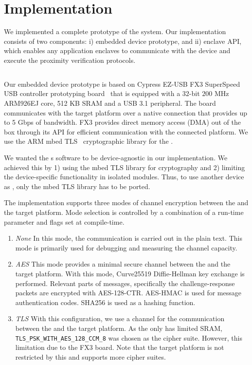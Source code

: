 \section{Implementation}
\label{sec:implementation}

We implemented a complete prototype of the \name system. Our implementation consists of two components: i) \device embedded device prototype, and ii) \name enclave API, which enables any application enclaves to communicate with the \device device and execute the proximity verification protocols.

\subsection{\device} 

Our embedded device prototype is based on Cypress EZ-USB FX3 SuperSpeed USB controller prototyping board~\cite{fx3} that is equipped with a $32$-bit $200$ MHz ARM926EJ core, 512 KB SRAM and a USB 3.1 peripheral. The board communicates with the target platform over a native  connection that provides up to 5 Gbps of bandwidth. FX3 provides direct memory access (DMA) out of the box through its API for efficient communication with the connected platform. We use the ARM mbed TLS~\cite{mbed} cryptographic library for the \tls.

 We wanted the \device{}s software to be device-agnostic in our implementation. We achieved this by 1) using the mbed TLS library for cryptography and 2) limiting the device-specific functionality in isolated modules. Thus, to use another device as \device, only the mbed TLS library has to be ported.

 The implementation supports three modes of channel encryption between the \device and the target platform. Mode selection is controlled by a combination of a run-time parameter and flags set at compile-time.

\begin{enumerate}
  \item \emph{None} In this mode, the communication is carried out in the plain text. This mode is primarily used for debugging and measuring the channel capacity.
  \item \emph{AES} This mode provides a minimal secure channel between the \device and the target platform. With this mode, Curve25519 Diffie-Hellman key exchange is performed. Relevant parts of messages, specifically the challenge-response packets are encrypted with AES-128-CTR. AES-HMAC is used for message authentication codes. SHA256 is used as a hashing function.
  \item \emph{TLS} With this configuration, we use a \tls channel for the communication between the \device and the target platform. As the \device only has limited SRAM, \texttt{TLS\_PSK\_WITH\_AES\_128\_CCM\_8} was chosen as the cipher suite. However, this limitation due to the FX3 board. Note that the target platform is not restricted by this and supports more cipher suites. 
\end{enumerate}


